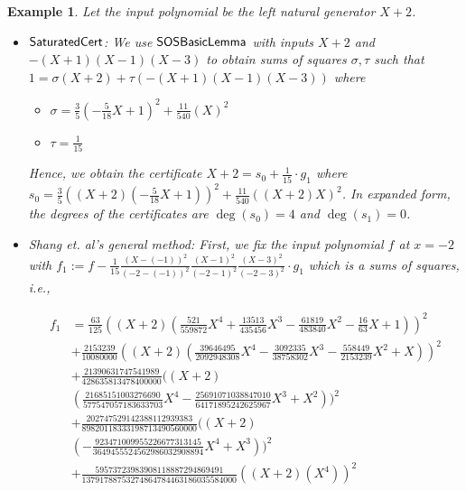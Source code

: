 \documentclass[preprint,12pt,authoryear]{elsarticle}
\newtheorem{example}[theorem]{Example}
\newenvironment{example1}
  {\begin{example}\rm}
  {\end{example}}
\newcommand{\wgm}{Shang et. al's general method\xspace}
\DeclareMathOperator{\algSOSBasicLemma}{\sf SOSBasicLemma}
\DeclareMathOperator{\algSaturatedCert}{\sf SaturatedCert}
\begin{document}
\begin{example1}
  \label{sec:comparison-with-an-1}
  Let the input polynomial be the left natural generator $X + 2$.

  \begin{itemize}
  \item $\algSaturatedCert$: We use $\algSOSBasicLemma$ with inputs $X + 2$ and
    $-(X + 1)(X - 1)(X - 3)$ to obtain sums of squares $\sigma, \tau$ such that
    $1 = \sigma (X + 2) + \tau (-(X + 1)(X - 1)(X - 3))$ where

    \begin{itemize}
    \item $\sigma = \frac{3}{5}(-\frac{5}{18}X+1)^2+\frac{11}{540}(X)^2$
    \item $\tau = \frac{1}{15}$
    \end{itemize}

    Hence, we obtain the certificate $X + 2 = s_0 + \frac{1}{15} \cdot g_1$
    where
    $s_0 = \frac{3}{5}((X +
    2)(-\frac{5}{18}X+1))^2+\frac{11}{540}((X+2)X)^2$. In expanded form, the
    degrees of the certificates are $\deg(s_0) = 4$ and $\deg(s_1) = 0$.
    
  \item \wgm: First, we fix the input polynomial $f$ at $x = -2$ with
    $f_1 := f - \frac{1}{15}\frac{(X - (-1))^{2}}{(-2 - (-1))^{2}}\frac{(X -
      1)^{2}}{(-2 - 1)^{2}}\frac{(X - 3)^{2}}{(-2 - 3)^{2}} \cdot g_1$ which is
    a sums of squares, i.e.,

    \begin{equation*} 
      \begin{split}
        f_1 &=
              \frac{63}{125}((X+2)(\frac{521}{559872}X^{4}
             +\frac{13513}{435456}X^{3}-\frac{61819}{483840}X^{2}-\frac{16}{63}X+1))^2\\ 
            &+\frac{2153239}{10080000}((X+2)(\frac{39646495}{2092948308}X^{4}-\frac{3092335}{38758302}X^{3}-\frac{558449}{2153239}X^{2}+X))^2\\
            &+\frac{21390631747541989}{428635813478400000}((X+2)\\
            &(\frac{21685151003276690}{577547057183633703}X^{4}-\frac{25691071038847010}{64171895242625967}X^{3}+X^{2}))^2\\
            &+\frac{202747529142388112939383}{89820118333198713490560000}((X+2)\\
            &(-\frac{923471009955226677313145}{3649455524562986032908894}X^{4}+X^{3}))^2\\
            &+\frac{59573723983908118887294869491}{13791788753274864784463186035584000}((X+2)(X^{4}))^2
      \end{split}
    \end{equation*}


\end{itemize}
\end{example1}
\end{document}
